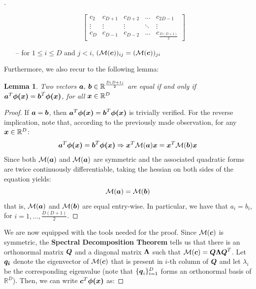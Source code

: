 \documentclass{exam}
\newtheorem{lemma}{Lemma}
\begin{document}
\begin{questions}
\begin{proof}[\unskip\nopunct]
\begin{itemize}
\[\begin{bmatrix}
                    c_2 & c_{D + 1} & c_{D + 2} & \dots & c_{2D - 1} \\
                    \vdots & \vdots & \vdots & \ddots & \vdots \\
                    c_D & c_{D - 1} & c_{D - 2} & \dots & c_{\frac{D(D + 1)}{2}} 
                \end{bmatrix}
            \]
            \item[--] for $1 \le i \le D$ and $j < i$, $(\mathcal{M}(\vb*{c}))_{ij} = (\mathcal{M}(\vb*{c}))_{ji}$
        \end{itemize}
        Furthermore, we also recur to the following lemma:

        \begin{lemma}
            Two vectors $\vb*{a}, \: \vb*{b} \in \mathbb{R}^{\frac{D(D + 1)}{2}}$ are equal if and only if $\vb*{a}^T \vb*{\phi(x)} = \vb*{b}^T \vb*{\phi(x)}$, for all $\vb*{x} \in \mathbb{R}^D$
        \end{lemma}
        \begin{proof}
            If $\vb*{a} = \vb*{b}$, then $\vb*{a}^T \vb*{\phi(x)} = \vb*{b}^T \vb*{\phi(x)}$ is trivially verified. For the reverse implication, note that, according to the previously made observation, for any $\vb*{x} \in \mathbb{R}^D$:
            \[
                \vb*{a}^T \vb*{\phi(x)} = \vb*{b}^T \vb*{\phi(x)} \Rightarrow \vb*{x}^T \mathcal{M}(\vb*{a}) \vb*{x} = \vb*{x}^T \mathcal{M}(\vb*{b}) \vb*{x}
            \]
            Since both $\mathcal{M}(\vb*{a})$ and $\mathcal{M}(\vb*{a})$ are symmetric and the associated quadratic forms are twice continuously differentiable, taking the hessian on both sides of the equation yields:
            \[
                \mathcal{M}(\vb*{a}) = \mathcal{M}(\vb*{b})
            \]
            that is, $\mathcal{M}(\vb*{a})$ and $\mathcal{M}(\vb*{b})$ are equal entry-wise. In particular, we have that $a_i = b_i$, for $i = 1, \dots, \frac{D(D + 1)}{2}$.
        \end{proof}
        We are now equipped with the tools needed for the proof. Since $\mathcal{M}(\vb*{c})$ is symmetric, the \textbf{Spectral Decomposition Theorem} tells us that there is an orthonormal matrix $\vb*{Q}$ and a diagonal matrix $\vb*{\Lambda}$ such that $\mathcal{M}(\vb*{c}) = \vb*{Q} \vb*{\Lambda}\vb*{Q}^T$. Let $\vb*{q_i}$ denote the eigenvector of $\mathcal{M}(\vb*{c})$ that is present in $i$-th column of $\vb*{Q}$ and let $\lambda_i$ be the corresponding eigenvalue (note that $\{\vb*{q}_i\}_{i = 1}^{D}$ forms an orthonormal basis of $\mathbb{R}^{D}$). Then, we can write $\vb*{c}^T \vb*{\phi(x)}$ as:

\end{proof}
\end{questions}
\end{document}
